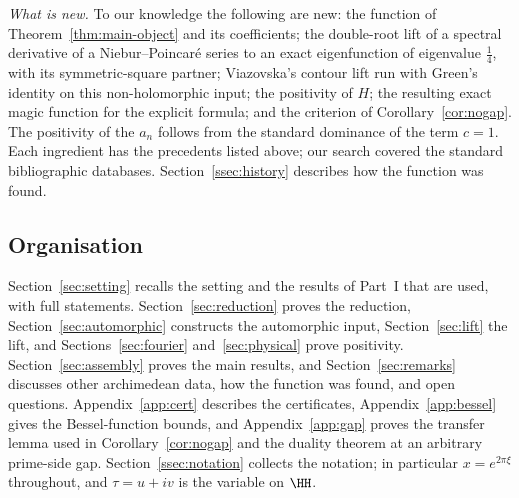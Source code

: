 \emph{What is new.} To our knowledge the following are new: the function of Theorem~\ref{thm:main-object} and its coefficients; the
double-root lift of a spectral derivative of a Niebur--Poincar\'e series to an exact eigenfunction of eigenvalue $\frac14$, with its
symmetric-square partner; Viazovska's contour lift run with Green's identity on this non-holomorphic input; the positivity of $H$; the resulting
exact magic function for the explicit formula; and the criterion of Corollary~\ref{cor:nogap}. The positivity of the $a_n$ follows from the
standard dominance of the term $c=1$. Each ingredient has the precedents listed above; our search covered the standard bibliographic databases.
Section~\ref{ssec:history} describes how the function was found.

\subsection{Organisation}

Section~\ref{sec:setting} recalls the setting and the results of Part~I that are used, with full statements. Section~\ref{sec:reduction} proves
the reduction, Section~\ref{sec:automorphic} constructs the automorphic input, Section~\ref{sec:lift} the lift, and Sections~\ref{sec:fourier}
and~\ref{sec:physical} prove positivity. Section~\ref{sec:assembly} proves the main results, and Section~\ref{sec:remarks} discusses other
archimedean data, how the function was found, and open questions. Appendix~\ref{app:cert} describes the certificates, Appendix~\ref{app:bessel}
gives the Bessel-function bounds, and Appendix~\ref{app:gap} proves the transfer lemma used in Corollary~\ref{cor:nogap} and the duality
theorem at an arbitrary prime-side gap. Section~\ref{ssec:notation} collects the notation; in particular $x=e^{2\pi\xi}$ throughout, and
$\tau=u+iv$ is the variable on $\HH$.
